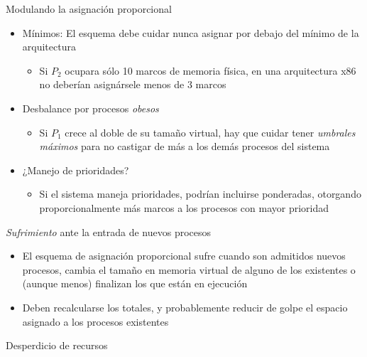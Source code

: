 \documentclass[presentation]{beamer}
\newcommand{\rarrow}{$\rightarrow$\hskip 0.5em}
\begin{document}
\begin{frame}[label={sec:orgf201867}]{Modulando la asignación proporcional}
\begin{itemize}
\item Mínimos: El esquema debe cuidar nunca asignar por debajo del mínimo
de la arquitectura
\begin{itemize}
\item Si \(P_2\) ocupara sólo 10 marcos de memoria física, en una
arquitectura x86 no deberían asignársele menos de 3 marcos
\end{itemize}
\item Desbalance por procesos \emph{obesos}
\begin{itemize}
\item Si \(P_1\) crece al doble de su tamaño virtual, hay que cuidar
tener \emph{umbrales máximos} para no castigar de más a los demás
procesos del sistema
\end{itemize}
\item ¿Manejo de prioridades?
\begin{itemize}
\item Si el sistema maneja prioridades, podrían incluirse ponderadas,
otorgando proporcionalmente más marcos a los procesos con mayor
prioridad
\end{itemize}
\end{itemize}
\end{frame}

\begin{frame}[label={sec:org74030b9}]{\emph{Sufrimiento} ante la entrada de nuevos procesos}
\begin{itemize}
\item El esquema de asignación proporcional sufre cuando son admitidos
nuevos procesos, cambia el tamaño en memoria virtual de alguno de
los existentes o (aunque menos) finalizan los que están en ejecución
\item Deben recalcularse los totales, y probablemente reducir de golpe el
espacio asignado a los procesos existentes
\end{itemize}
\end{frame}

\begin{frame}[label={sec:org99e67d6}]{Desperdicio de recursos}
\end{frame}
\end{document}
